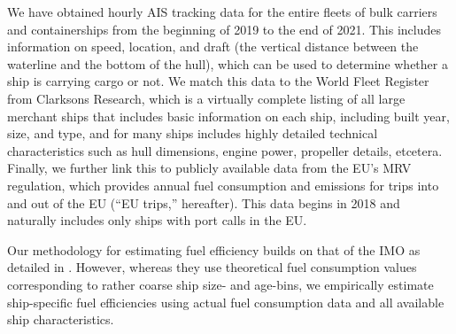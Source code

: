 \documentclass[hidelinks, 12pt,letterpaper]{article}
\begin{document}
We have obtained hourly AIS tracking data for the entire fleets of bulk carriers and containerships from the beginning of 2019 to the end of 2021. This includes information on speed, location, and draft (the vertical distance between the waterline and the bottom of the hull), which can be used to determine whether a ship is carrying cargo or not. We match this data to the World Fleet Register from Clarksons Research, which is a virtually complete listing of all large merchant ships that includes basic  information on each ship, including built year, size, and type, and for many ships includes highly detailed technical characteristics such as hull dimensions, engine power, propeller details, etcetera. Finally, we further link this to publicly available data from the EU's MRV regulation, which provides annual fuel consumption and emissions for trips into and out of the EU (``EU trips,'' hereafter). This data begins in 2018 and naturally includes only ships with port calls in the EU.

Our methodology for estimating fuel efficiency builds on that of the IMO as detailed in \citet{faber2020fourth}.
However, whereas they use theoretical fuel consumption values corresponding to rather coarse ship size- and age-bins, we empirically estimate ship-specific fuel efficiencies using actual fuel consumption data and all available ship characteristics. 
\end{document}
